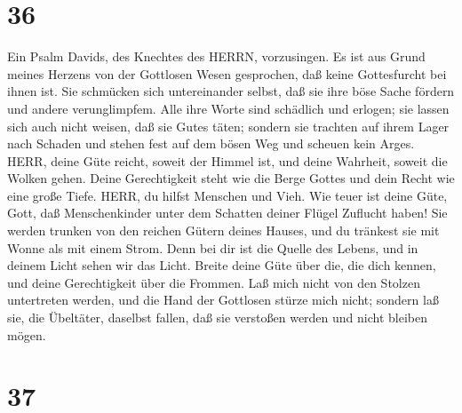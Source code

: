 \hypertarget{section-35}{%
\section{36}\label{section-35}}

 Ein Psalm Davids, des Knechtes des HERRN, vorzusingen. Es
ist aus Grund meines Herzens von der Gottlosen Wesen gesprochen, daß
keine Gottesfurcht bei ihnen ist.  Sie schmücken sich
untereinander selbst, daß sie ihre böse Sache fördern und andere
verunglimpfem.  Alle ihre Worte sind schädlich und erlogen;
sie lassen sich auch nicht weisen, daß sie Gutes täten; 
sondern sie trachten auf ihrem Lager nach Schaden und stehen fest auf
dem bösen Weg und scheuen kein Arges.  HERR, deine Güte
reicht, soweit der Himmel ist, und deine Wahrheit, soweit die Wolken
gehen.  Deine Gerechtigkeit steht wie die Berge Gottes und
dein Recht wie eine große Tiefe. HERR, du hilfst Menschen und Vieh.
 Wie teuer ist deine Güte, Gott, daß Menschenkinder unter
dem Schatten deiner Flügel Zuflucht haben!  Sie werden
trunken von den reichen Gütern deines Hauses, und du tränkest sie mit
Wonne als mit einem Strom.  Denn bei dir ist die Quelle des
Lebens, und in deinem Licht sehen wir das Licht.  Breite
deine Güte über die, die dich kennen, und deine Gerechtigkeit über die
Frommen.  Laß mich nicht von den Stolzen untertreten
werden, und die Hand der Gottlosen stürze mich nicht; 
sondern laß sie, die Übeltäter, daselbst fallen, daß sie verstoßen
werden und nicht bleiben mögen.

\hypertarget{section-36}{%
\section{37}\label{section-36}}

